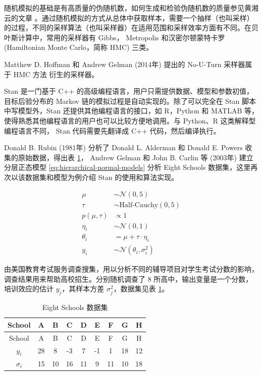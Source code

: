 \documentclass[12pt,a4paper,UTF8,twoside]{book}
\theoremstyle{definition}
\theoremstyle{definition}
\theoremstyle{definition}
\theoremstyle{remark}
\begin{document}
随机模拟的基础是有高质量的伪随机数，如何生成和检验伪随机数的质量参见黄湘云的文章
\citep{Huang2017COS}。通过随机模拟的方式从总体中获取样本，需要一个抽样（也叫采样）的过程，不同的采样算法（也叫采样器）在适用范围和采样效率方面有不同。在贝叶斯计算中，常用的采样器有
Gibbs， Metropolis 和汉密尔顿蒙特卡罗 (Hamiltonian Monte Carlo，简称
HMC) 三类。

Matthew D. Hoffman 和 Andrew Gelman (2014年) \citep{hoffman2014} 提出的
No-U-Turn 采样器属于 HMC 方法 衍生的采样器。

Stan 是一门基于 C++
的高级编程语言，用户只需提供数据、模型和参数初值，目标后验分布的 Markov
链的模拟过程是自动实现的。除了可以完全在 Stan 脚本中写模型外，Stan
还提供其他编程语言的接口，如 R，Python 和 MATLAB
等，使得熟悉其他编程语言的用户也可以比较方便地调用。与 Python、R
这类解释型编程语言不同， Stan 代码需要先翻译成 C++ 代码，然后编译执行。

Donald B. Rubin (1981年) \citep{Rubin1981} 分析了 Donald L. Alderman 和
Donald E. Powers \citep{Alderman1980} 收集的原始数据，得出表
\ref{tab:eight-high-schools}， Andrew Gelman 和 John B. Carlin 等
(2003年) \citep{Gelman2003} 建立分层正态模型
\eqref{eq:hierarchical-normal-models} 分析 Eight Schools
数据集，这里再次以该数据集和模型为例介绍 Stan 的使用和算法实现。

\begin{equation}
\begin{aligned}
     \mu & \sim \mathcal{N}(0,5) \\
    \tau & \sim \text{Half-Cauchy}(0,5) \\
p(\mu,\tau) & \propto 1 \\
  \eta_i & \sim \mathcal{N}(0,1) \\
\theta_i &  =   \mu + \tau \cdot \eta_i \\
     y_i & \sim \mathcal{N}(\theta_i,\sigma^2_{i})
\end{aligned}
\label{eq:hierarchical-normal-models}
\end{equation}

由美国教育考试服务调查搜集，用以分析不同的辅导项目对学生考试分数的影响，调查结果用来帮助高校招生。分别随机调查了
8 所高中，输出变量是一个分数，培训效应的估计 \(y_j\)，其样本方差
\(\sigma^2_j\)，数据集见表 \ref{tab:eight-high-schools}。

\begin{longtable}[]{@{}ccccccccc@{}}
\caption{\label{tab:eight-high-schools} Eight Schools 数据集}\tabularnewline
\toprule
School & A & B & C & D & E & F & G & H\tabularnewline
\midrule
\endfirsthead
\toprule
School & A & B & C & D & E & F & G & H\tabularnewline
\midrule
\endhead
\(y_i\) & 28 & 8 & -3 & 7 & -1 & 1 & 18 & 12\tabularnewline
\(\sigma_i\) & 15 & 10 & 16 & 11 & 9 & 11 & 10 & 18\tabularnewline
\bottomrule
\end{longtable}
\end{document}
